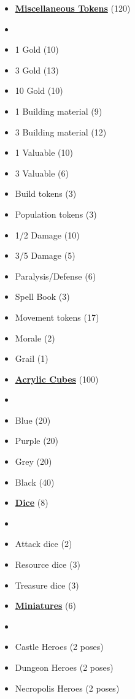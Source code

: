 \begin{multicols*}{3}
\begin{itemize}[leftmargin=0pt, label={}, noitemsep, noitemsep]
  \item \textbf{\small{\underline{Miscellaneous Tokens}}} (120)
  \item
  \item 1 Gold (10)
  \item 3 Gold (13)
  \item 10 Gold (10)
  \item 1 Building material (9)
  \item 3 Building material (12)
  \item 1 Valuable (10)
  \item 3 Valuable (6)
  \item Build tokens (3)
  \item Population tokens (3)
  \item 1/2 Damage (10)
  \item 3/5 Damage (5)
  \item Paralysis/Defense (6)
  \item Spell Book (3)
  \item Movement tokens (17)
  \item Morale (2)
  \item Grail (1)
\end{itemize}
\columnbreak
\begin{itemize}[leftmargin=0pt, label={}, noitemsep, noitemsep]
  \item \textbf{\small{\underline{Acrylic Cubes}}} (100)
  \item
  \item Blue (20)
  \item Purple (20)
  \item Grey (20)
  \item Black (40)
\end{itemize}

\begin{itemize}[leftmargin=0pt, label={}, noitemsep, noitemsep]
  \item \textbf{\small{\underline{Dice}}} (8)
  \item
  \item Attack dice (2)
  \item Resource dice (3)
  \item Treasure dice (3)
\end{itemize}

\begin{itemize}[leftmargin=0pt, label={}, noitemsep, noitemsep]
  \item \textbf{\small{\underline{Miniatures}}} (6)
  \item
  \item Castle Heroes (2 poses)
  \item Dungeon Heroes (2 poses)
  \item Necropolis Heroes (2 poses)
\end{itemize}


\end{multicols*}
